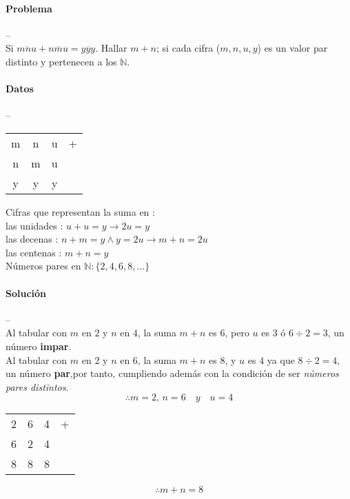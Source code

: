 \documentclass[12pt, a4paper]{article}
\begin{document}
\paragraph*{Problema} -- \\

\noindent Si $\overline{mnu} + \overline{nmu} = \overline{yyy}$. Hallar $m + n$; si cada cifra ($m, n, u, y$) es un valor par distinto y pertenecen a los $\mathbb{N}$.

\paragraph*{Datos} -- \\

\begin{center}
\begin{tabular}{cccc}
	m & n & u & + \\
	n & m & u & \empty \\
	\hline
	y & y & y & \empty
\end{tabular}
\end{center}

\noindent Cifras que representan la suma en : \\
\hspace*{0.6cm}las unidades : $u + u = y \to 2u = y$ \\
\hspace*{0.6cm}las decenas : $n + m = y \wedge y = 2u \to m + n = 2u$ \\
\hspace*{0.6cm}las centenas : $m + n = y$ \\
Números pares en $\mathbb{N} : \{2, 4, 6, 8, \ldots \}$ 

\paragraph*{Solución} -- \\

\noindent Al tabular con $m$ en $2$ y $n$ en $4$, la suma $m + n$ es $6$, pero $u$ es $3$ ó $6 \div 2 = 3$, un número \textbf{impar}. \\
Al tabular con $m$ en $2$ y $n$ en $6$, la suma $m + n$ es $8$, y $u$ es $4$ ya que $8 \div 2 = 4$, un número \textbf{par},por tanto, cumpliendo además con la condición de ser \textit{números pares distintos}.
$$
\therefore m = 2,\,n = 6\quad y\quad u = 4
$$

\begin{center}
\begin{tabular}{cccc}
	2 & 6 & 4 & + \\
	6 & 2 & 4 & \empty \\
	\hline
	8 & 8 & 8 & \empty
\end{tabular}
\end{center}

$$
\therefore m  + n = 8
$$
\end{document}
